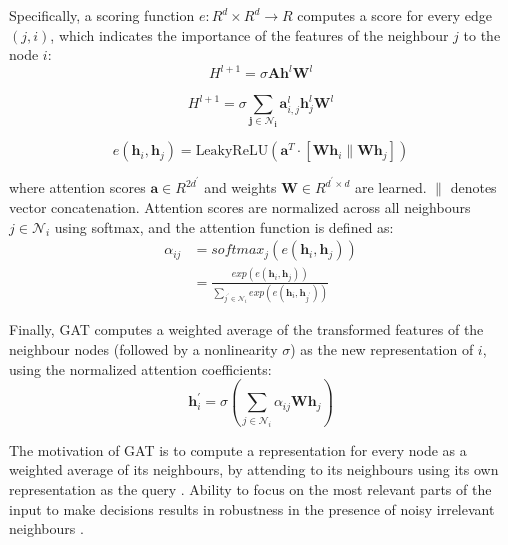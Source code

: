 \documentclass{article}
\begin{document}
Specifically, a scoring function $e:R^{d}\times R^{d}\rightarrow R$ computes a score for every edge $ (j,i)$, which indicates the importance of the features of the neighbour $j$ to the node $i$: 
\begin{equation} 
H^{l+1} = \sigma \mathbf{A}\mathbf{h}^l\mathbf{W}^l 
\end{equation} 

\begin{equation} 
H^{l+1} = \sigma \sum_{\mathbf{j}\in \mathcal{N}_{\mathbf{i}}}^{}\mathbf{a}_{i,j}^l\mathbf{h}_j^l\mathbf{W}^l 
\end{equation}

\begin{equation} 
e\left(\mathbf{h}_{i},\mathbf{h}_{j}\right) = \textrm{LeakyReLU} \left(\mathbf{a}^{T}  
\cdot \left[\mathbf{W}\mathbf{h}_{i}\parallel\mathbf{W}\mathbf{h}_{j}\right]\right) 
\label{eq-GAT}
\end{equation} 

where attention scores $\mathbf{a}\in R^{2d^{'}}$ and weights $\mathbf{W}\in R^{d^{'}\times d}$ are learned. $\parallel$ denotes vector concatenation. Attention scores are normalized across all neighbours $ j\in\mathcal{N}_i$ using softmax, and the attention function is defined as:
\begin{equation} 
\begin{split}
\alpha_{ij} & = softmax_{j}\left(e\left(\mathbf{h}_{i},\mathbf{h}_{j}\right)\right) \\
& =\frac{exp\left(e\left(\mathbf{h}_{i},\mathbf{h}_{j}\right)\right)}{\sum_{j^{'}\in\mathcal{N}_{i}}^{} exp\left(e\left(\mathbf{h}_{i},\mathbf{h}_{j^{'}}\right)\right)} 
\end{split}
\end{equation} 

Finally, GAT computes a weighted average of the transformed features of the neighbour nodes (followed by a nonlinearity $ \sigma$) as the new representation of $i$, using the normalized attention coefficients:
\begin{equation} 
\mathbf{h}_{i}^{'} = \sigma\left(\sum_{j\in\mathcal{N}_{i}}^{}\alpha_{ij}\mathbf{W}\mathbf{h}_{j}\right) 
\end{equation} 

The motivation of GAT is to compute a representation for every node as a weighted average of its neighbours, by attending to its neighbours using its own representation as the query \cite{velivckovic2018graph}. Ability to focus on the most relevant parts of the input to make decisions results in robustness in the presence of noisy irrelevant neighbours \cite{alon2020bottleneck}.
\end{document}
